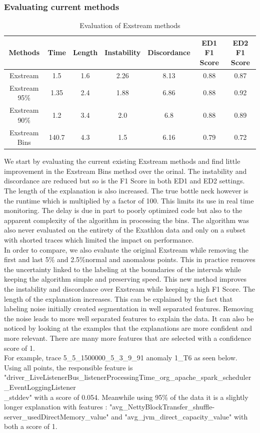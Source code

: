 \documentclass[oneside, a4paper, onecolumn, 11pt]{article}
\begin{document}
\subsubsection{Evaluating current methods}
\begin{table}[h]
  \centering
  \begin{tabular}{|c|c|c|c|c|c|c|}
      \hline
      Methods & Time & Length & Instability & Discordance & ED1 F1 Score & ED2 F1 Score\\ 
      \hline
      Exstream  & 1.5  & 1.6  & 2.26  & 8.13 & 0.88 & 0.87  \\ 
      Exstream 95\%  & 1.35  & 2.4  & 1.88  & 6.86 & 0.88 & 0.92\\ 
      Exstream 90\%  & 1.2  & 3.4  & 2.0  & 6.8 & 0.88 & 0.89\\ 
      Exstream Bins  & 140.7  & 4.3  & 1.5  & 6.16 & 0.79 & 0.72 \\ 
      \hline
  \end{tabular}
  \caption{Evaluation of Exstream methods}
  \label{tab:example}
\end{table}
We start by evaluating the current existing Exstream methods and find little improvement in the Exstream Bins method over the orinal. The instability and discordance are reduced but so is the F1 Score in both ED1 and ED2 settings. The length of the explanation is also increased. The true bottle neck however is the runtime which is multiplied by a factor of 100. This limits its use in real time monitoring. The delay is due in part to poorly optimized code but also to the apparent complexity of the algorithm in processing the bins. The algorithm was also never evaluated on the entirety of the Exathlon data and only on a subset with shorted traces which limited the impact on performance.\\ 
In order to compare, we also evaluate the original Exstream while removing the first and last 5\% and 2.5\%normal and anomalous points. This in practice removes the uncertainty linked to the labeling at the boundaries of the intervals while keeping the algorithm simple and preserving speed. This new method improves the instability and discordance over Exstream while keeping a high F1 Score. The length of the explanation increases. This can be explained by the fact that labeling noise initially created segmentation in well separated features. Removing the noise leads to more well separated features to explain the data.  It can also be noticed by looking at the examples that the explanations are more confident and more relevant. There are many more features that are selected with a confidence score of 1. \\
For example, trace 5\_5\_1500000\_5\_3\_9\_91 anomaly 1\_T6 as seen below. Using all points, the responsible feature is 
"driver\_LiveListenerBus\_listenerProcessingTime\_org\_apache\_spark\_scheduler\_EventLoggingListener\\\_stddev" with a score of 0.054. Meanwhile using 95\% of the data it is a slightly longer explanation with features : "avg\_NettyBlockTransfer\_shuffle-server\_usedDirectMemory\_value" and "avg\_jvm\_direct\_capacity\_value" with both a score of 1.\\
\end{document}
